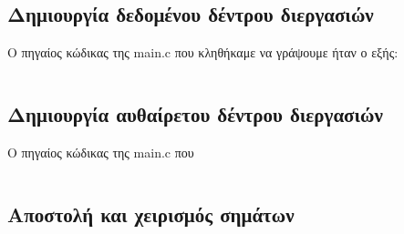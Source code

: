 \documentclass[a4paper,10pt]{article} \usepackage{anysize}
\begin{document}


\section*{} \setcounter{section}{1}
\subsection{Δημιουργία δεδομένου δέντρου διεργασιών} Ο πηγαίος κώδικας της main.c που
κληθήκαμε να γράψουμε ήταν ο εξής:

\inputminted[linenos]{c}{files/ask2-fork.c}

\subsection{Δημιουργία αυθαίρετου δέντρου διεργασιών} Ο πηγαίος κώδικας της main.c που

\inputminted[linenos]{c}{files/ask2-tree.c}

\subsection{Αποστολή και χειρισμός σημάτων}

\inputminted[linenos]{c}{files/ask2-signals.c}
\end{document}
